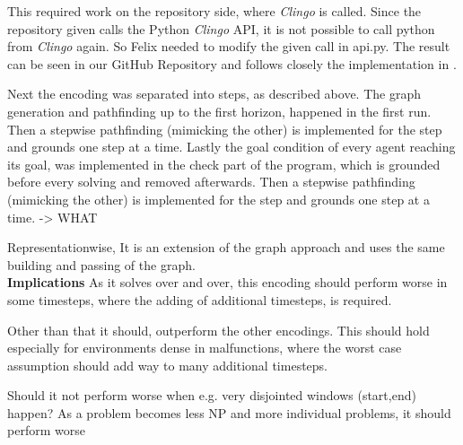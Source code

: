 This required work on the repository side, where \textit{Clingo} is called. Since the repository given calls the Python \textit{Clingo} API, it is not possible to call python from \textit{Clingo} again. So Felix needed to modify the given call in api.py. The result can be seen in our GitHub Repository and follows closely the implementation in \cite{incr}.

Next the encoding was separated into steps, as described above. The graph generation and pathfinding up to the first horizon, happened in the first run. Then a stepwise pathfinding (mimicking the other) is implemented for the step and grounds one step at a time. Lastly the goal condition of every agent reaching its goal, was implemented in the check part of the program, which is grounded before every solving and removed afterwards.
\color{red} Then a stepwise pathfinding (mimicking the other) is implemented for the step and grounds one step at a time. -> WHAT\color{black}

Representationwise, It is an extension of the graph approach and uses the same building and passing of the graph.\\

\noindent \textbf{Implications} As it solves over and over, this encoding should perform worse in some timesteps, where the adding of additional timesteps, is required.

Other than that it should, outperform the other encodings. This should hold especially for environments dense in malfunctions, where the worst case assumption should add way to many additional timesteps.

\color{red} Should it not perform worse when e.g.  very disjointed windows (start,end) happen? As a problem becomes less NP and more individual problems, it should perform worse \color{black}
